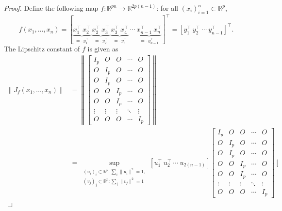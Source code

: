 \documentclass[11pt,a4paper]{article}
\theoremstyle{remark}
\theoremstyle{definition}
\newcommand{\bsf}{f}
\newcommand{\bu}{u}
\newcommand{\bv}{v}
\newcommand{\bx}{x}
\newcommand{\by}{y}
\newcommand{\bfI}{I}
\newcommand{\bfJ}{J}
\newcommand{\bfO}{O}
\newcommand{\R}{\mathbb{R}}
\theoremstyle{definition}
\begin{document}
\begin{bibunit}[apalike]
\begin{proof}
    Define the following map $\bsf:\R^{pn}\to\R^{2p(n-1)}$: for all $(\bx_{i})_{i=1}^{n}\subset\R^{p}$,
\begin{equation*}
    \bsf(\bx_{1},\ldots,\bx_{n})=[
        \underbrace{\bx_{1}^{\top} \ \bx_{2}^{\top}}_{=:\by_{1}^{\top}} \ \underbrace{\bx_{2}^{\top} \ \bx_{3}^{\top}}_{=:\by_{2}^{\top}} \ \underbrace{\bx_{3}^{\top} \ \bx_{4}^{\top}}_{=:\by_{3}^{\top}} \ \cdots \ 
        \underbrace{\bx_{n-1}^{\top} \ \bx_{n}^{\top}}_{=:\by_{n-1}^{\top}}
    ]^{\top}=[\by_{1}^{\top}\ \by_{2}^{\top}\ \cdots\ \by_{n-1}^{\top}]^{\top}.
\end{equation*}
The Lipschitz constant of $\bsf$ is given as
\begin{align*}
    \left\|\bfJ_{\bsf}(\bx_{1},\ldots,\bx_{n})\right\|&=\left\|\left[\begin{matrix}
        \bfI_{p} & \bfO & \bfO & \cdots & \bfO\\
        \bfO & \bfI_{p} & \bfO & \cdots & \bfO\\
        \bfO & \bfI_{p} & \bfO & \cdots & \bfO\\
        \bfO & \bfO & \bfI_{p} & \cdots & \bfO\\
        \bfO & \bfO & \bfI_{p} & \cdots & \bfO\\
        \vdots & \vdots & \vdots & \ddots & \vdots \\
        \bfO & \bfO & \bfO & \cdots & \bfI_{p}
    \end{matrix}\right]\right\|\\
    &=\sup_{\substack{(\bu_{i})_{i}\subset\R^{p}:\sum_{i}\|\bu_{i}\|^{2}=1,\\(\bv_{j})_{j}\subset\R^{p}:\sum_{j}\|\bv_{j}\|^{2}=1}}\left[
        \bu_{1}^{\top}\ \bu_{2}^{\top}\ \cdots\ \bu_{2(n-1)}
    \right]\left[\begin{matrix}
        \bfI_{p} & \bfO & \bfO & \cdots & \bfO\\
        \bfO & \bfI_{p} & \bfO & \cdots & \bfO\\
        \bfO & \bfI_{p} & \bfO & \cdots & \bfO\\
        \bfO & \bfO & \bfI_{p} & \cdots & \bfO\\
        \bfO & \bfO & \bfI_{p} & \cdots & \bfO\\
        \vdots & \vdots & \vdots & \ddots & \vdots \\
        \bfO & \bfO & \bfO & \cdots & \bfI_{p}
    \end{matrix}\right]\left[\begin{matrix}

\end{matrix}
\end{align*}
\end{proof}
\end{bibunit}
\end{document}
